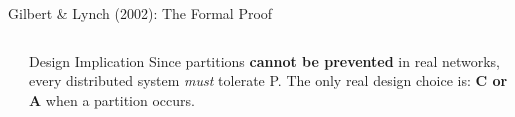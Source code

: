 \documentclass[aspectratio=169,10pt]{beamer}
\begin{document}
\begin{frame}{Gilbert \& Lynch (2002): The Formal Proof}
\begin{columns}[T]
\begin{center}
      \end{center}
      \vspace{4pt}
      \begin{alertblock}{Design Implication}
        Since partitions \textbf{cannot be prevented} in real networks, every distributed system \emph{must} tolerate P.  The only real design choice is: \textbf{C or A} when a partition occurs.
      \end{alertblock}
  \end{columns}
\end{frame}
\end{document}
